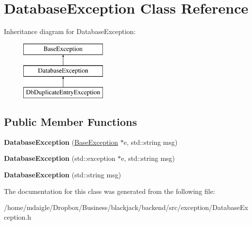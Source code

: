 \hypertarget{classDatabaseException}{
\section{\-Database\-Exception \-Class \-Reference}
\label{d7/dd5/classDatabaseException}
}
\-Inheritance diagram for \-Database\-Exception\-:\begin{figure}[H]
\begin{center}
\leavevmode
\includegraphics[height=3.000000cm]{d7/dd5/classDatabaseException}
\end{center}
\end{figure}
\subsection*{\-Public \-Member \-Functions}
\begin{DoxyCompactItemize}
\item 
\hypertarget{classDatabaseException_ad898a38d3d06a7bc42fa1fe0c5a9262b}{
{\bfseries \-Database\-Exception} (\hyperlink{classBaseException}{\-Base\-Exception} $\ast$e, std\-::string msg)}
\label{d7/dd5/classDatabaseException_ad898a38d3d06a7bc42fa1fe0c5a9262b}

\item 
\hypertarget{classDatabaseException_af6b4c448c7c643aae04bef0e23210338}{
{\bfseries \-Database\-Exception} (std\-::exception $\ast$e, std\-::string msg)}
\label{d7/dd5/classDatabaseException_af6b4c448c7c643aae04bef0e23210338}

\item 
\hypertarget{classDatabaseException_abd011b3c25856cbb70cb28c8b4219613}{
{\bfseries \-Database\-Exception} (std\-::string msg)}
\label{d7/dd5/classDatabaseException_abd011b3c25856cbb70cb28c8b4219613}

\end{DoxyCompactItemize}


\-The documentation for this class was generated from the following file\-:\begin{DoxyCompactItemize}
\item 
/home/mdaigle/\-Dropbox/\-Business/blackjack/backend/src/exception/\-Database\-Exception.\-h\end{DoxyCompactItemize}
